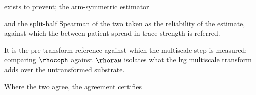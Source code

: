     exists to prevent; the arm-symmetric estimator

    and the split-half Spearman of the two taken as the reliability of the estimate, against which the between-patient spread in trace strength is referred.

    It is the pre-transform reference against which the multiscale step is measured: comparing \(\rhocoph\) against \(\rhoraw\) isolates what the \gls{lrg} multiscale transform adds over the untransformed substrate.

    Where the two agree, the agreement certifies


